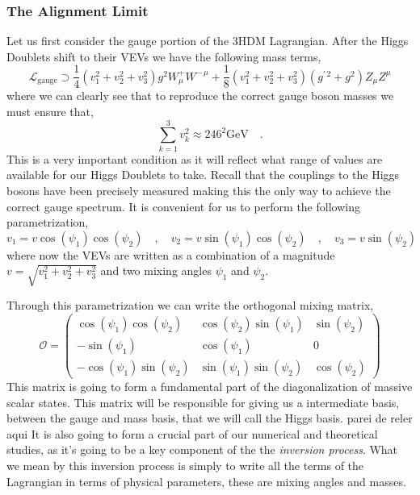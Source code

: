 \subsubsection{The Alignment Limit}

Let us first consider the gauge portion of the 3HDM Lagrangian. After the Higgs Doublets shift to their VEVs we have the following mass terms, 
%
\begin{equation}
\mathcal{L}_{\text{gauge}} \supset \frac{1}{4} \left( v_1^2 + v_2^2  + v_3^2 \right) g^2 W^+_\mu W^{-\,\mu} + \frac{1}{8} \left(  v_1^2 + v_2^2  + v_3^2  \right) \left( g^{\prime \, 2} + g^2 \right) Z_\mu Z^\mu  
\end{equation}
where we can clearly see that to reproduce the correct gauge boson masses we must ensure that, 
\begin{equation}
\label{eq:VEV_Condition}
\sum_{k=1}^3 v_k^2 \approx 246^2 \text{GeV} \quad . 
\end{equation}
This is a very important condition as it will reflect what range of values are available for our Higgs Doublets to take. Recall that the couplings to the Higgs bosons have been precisely measured making this the only way to achieve the correct gauge spectrum. 
%
It is convenient for us to perform the following parametrization,
%
\begin{equation}
v_1 = v \cos(\psi_1) \cos(\psi_2) \quad , \quad v_2 = v \sin(\psi_1) \cos(\psi_2) \quad , \quad v_3 = v \sin(\psi_2)
\end{equation}
where now the VEVs are written as a combination of a magnitude $v=\sqrt{v_1^2 + v_2^2 + v_3^2 }$ and two mixing angles $\psi_1$ and $\psi_2$. 

Through this parametrization we can write the orthogonal mixing matrix, 
\begin{equation}
\label{eq:3HDM_Orthg}
\mathcal{O} = 
\begin{pmatrix}
\cos(\psi_1) \cos(\psi_2) & \cos(\psi_2) \sin(\psi_1) & \sin(\psi_2) \\ 
- \sin(\psi_1) & \cos(\psi_1) & 0 \\ 
- \cos(\psi_1) \sin(\psi_2) & \sin(\psi_1) \sin(\psi_2) & \cos(\psi_2)
\end{pmatrix}
\end{equation}
%
This matrix is going to form a fundamental part of the diagonalization of massive scalar states. 
% 
This matrix will be responsible for giving us a intermediate basis, between the gauge and mass basis, that we will call the Higgs basis. { \color{red} parei de reler aqui } 
%
It is also going to form a crucial part of our numerical and theoretical studies, as it's going to be a key component of the the \textit{inversion process}. What we mean by this inversion process is simply to write all the terms of the Lagrangian in terms of physical parameters, these are mixing angles and masses. 

